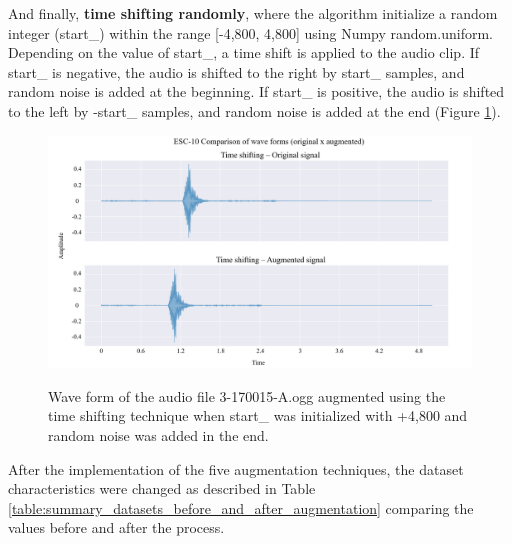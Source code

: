 And finally, \textbf{time shifting randomly}, where the algorithm initialize a random integer (start\_) within the range [-4,800, 4,800] using Numpy random.uniform. Depending on the value of start\_, a time shift is applied to the audio clip. If start\_ is negative, the audio is shifted to the right by start\_ samples, and random noise is added at the beginning. If start\_ is positive, the audio is shifted to the left by -start\_ samples, and random noise is added at the end (Figure \ref{fig:methods_augmentation_time_shifting}).

\begin{figure}[htbp]
    \raggedright
        \caption{Wave form of the audio file 3-170015-A.ogg augmented using the time shifting technique when start\_ was initialized with +4,800 and random noise was added in the end.}
        \includegraphics[width=1\textwidth]{resources/images/050-methods/Methods_augmentation_time_shifting.png}
        \label{fig:methods_augmentation_time_shifting}
\end{figure}

After the implementation of the five augmentation techniques, the dataset characteristics were changed as described in Table \ref{table:summary_datasets_before_and_after_augmentation} comparing the values before and after the process.

